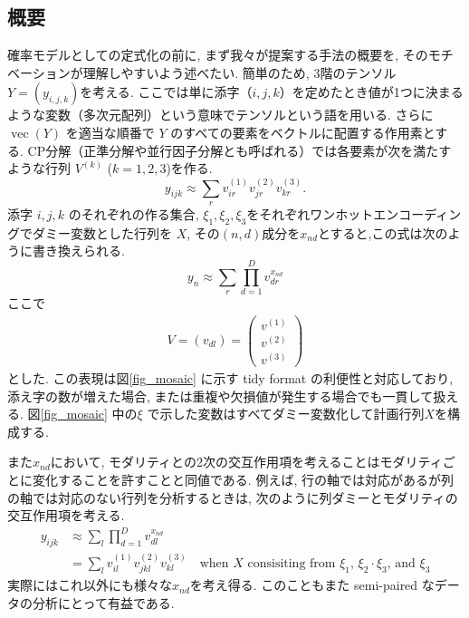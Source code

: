 \documentclass[a4paper,12ptc]{jsarticle} %
\begin{document}
\subsection{概要}
確率モデルとしての定式化の前に, まず我々が提案する手法の概要を, そのモチベーションが理解しやすいよう述べたい. 簡単のため, 3階のテンソル $Y=(y_{i,j,k})$を考える. ここでは単に添字（$i,j,k$）を定めたとき値が1つに決まるような変数（多次元配列）という意味でテンソルという語を用いる. さらに $\operatorname{vec}(Y)$ を適当な順番で $Y$ のすべての要素をベクトルに配置する作用素とする. 
CP分解（正準分解や並行因子分解とも呼ばれる）では各要素が次を満たすような行列 $V^{(k)}$ ($k=1,2,3$)を作る.
\begin{equation*}
y_{ijk} \approx \sum_{r}v_{ir}^{(1)} v_{jr}^{(2)} v_{kr}^{(3)}. 
\end{equation*}
添字 $i,j,k$ のそれぞれの作る集合, $\xi_1, \xi_2, \xi_3$をそれぞれワンホットエンコーディングでダミー変数とした行列を $X$, その$(n,d)$成分を$x_{nd}$とすると,この式は次のように書き換えられる.
\begin{equation}
y_{n} \approx \sum_{r}\prod_{d=1}^D v_{dr}^{x_{nd}} \label{eq_approx}
\end{equation}
ここで
\begin{align*}
V=(v_{dl})=\begin{pmatrix}
v^{(1)}\\
v^{(2)}\\
v^{(3)}
\end{pmatrix}
\end{align*}
とした. この表現は図\ref{fig_mosaic} に示す tidy format  \cite{Wickham2019} の利便性と対応しており, 添え字の数が増えた場合, または重複や欠損値が発生する場合でも一貫して扱える. 図\ref{fig_mosaic} 中の$\xi$ で示した変数はすべてダミー変数化して計画行列$X$を構成する.

また$x_{nd}$において, モダリティとの2次の交互作用項を考えることはモダリティごとに変化することを許すことと同値である. 
例えば, 行の軸では対応があるが列の軸では対応のない行列を分析するときは, 次のように列ダミーとモダリティの交互作用項を考える.
\begin{align*}
y_{ijk} &\approx \sum_{l}\prod_{d=1}^D v_{dl}^{x_{nd}} \\
&=\sum_{l}v_{il}^{(1)} v_{jkl}^{(2)} v_{kl}^{(3)} \quad \mbox{when $X$ consisiting from $\xi_1$, $\xi_2 \cdot \xi_3$, and $\xi_3$}
\end{align*}
実際にはこれ以外にも様々な$x_{nd}$を考え得る. このこともまた semi-paired なデータの分析にとって有益である. 
\end{document}

